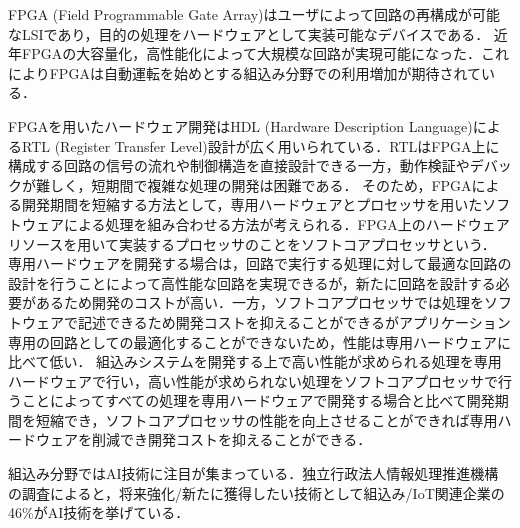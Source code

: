 FPGA (Field Programmable Gate Array)はユーザによって回路の再構成が可能なLSIであり，目的の処理をハードウェアとして実装可能なデバイスである．
近年FPGAの大容量化，高性能化によって大規模な回路が実現可能になった．これによりFPGAは自動運転を始めとする組込み分野での利用増加が期待されている．

FPGAを用いたハードウェア開発はHDL (Hardware Description Language)によるRTL (Register Transfer Level)設計が広く用いられている．RTLはFPGA上に構成する回路の信号の流れや制御構造を直接設計できる一方，動作検証やデバックが難しく，短期間で複雑な処理の開発は困難である\cite{bib:fpga}．
そのため，FPGAによる開発期間を短縮する方法として，専用ハードウェアとプロセッサを用いたソフトウェアによる処理を組み合わせる方法が考えられる．FPGA上のハードウェアリソースを用いて実装するプロセッサのことをソフトコアプロセッサという．
専用ハードウェアを開発する場合は，回路で実行する処理に対して最適な回路の設計を行うことによって高性能な回路を実現できるが，新たに回路を設計する必要があるため開発のコストが高い．一方，ソフトコアプロセッサでは処理をソフトウェアで記述できるため開発コストを抑えることができるがアプリケーション専用の回路としての最適化することができないため，性能は専用ハードウェアに比べて低い．
組込みシステムを開発する上で高い性能が求められる処理を専用ハードウェアで行い，高い性能が求められない処理をソフトコアプロセッサで行うことによってすべての処理を専用ハードウェアで開発する場合と比べて開発期間を短縮でき，ソフトコアプロセッサの性能を向上させることができれば専用ハードウェアを削減でき開発コストを抑えることができる．

組込み分野ではAI技術に注目が集まっている．独立行政法人情報処理推進機構の調査によると，将来強化/新たに獲得したい技術として組込み/IoT関連企業の46\%がAI技術を挙げている\cite{bib:ipa}．

